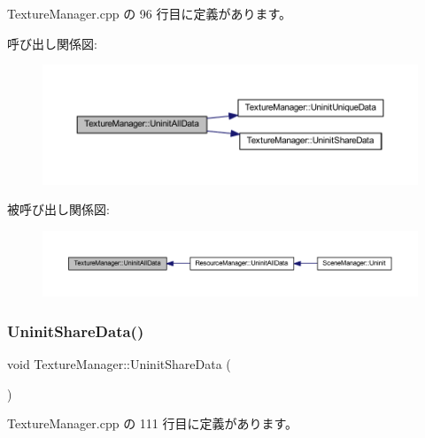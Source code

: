  Texture\+Manager.\+cpp の 96 行目に定義があります。

呼び出し関係図\+:
\nopagebreak
\begin{figure}[H]
\begin{center}
\leavevmode
\includegraphics[width=350pt]{class_texture_manager_a5e81df5cd89e7794fb9230357663a729_cgraph}
\end{center}
\end{figure}
被呼び出し関係図\+:
\nopagebreak
\begin{figure}[H]
\begin{center}
\leavevmode
\includegraphics[width=350pt]{class_texture_manager_a5e81df5cd89e7794fb9230357663a729_icgraph}
\end{center}
\end{figure}
\mbox{\label{class_texture_manager_a770b76a28bac4c20c16960f58a2d3b77}} 
\subsubsection{\texorpdfstring{Uninit\+Share\+Data()}{UninitShareData()}}
{\footnotesize\ttfamily void Texture\+Manager\+::\+Uninit\+Share\+Data (\begin{DoxyParamCaption}{ }\end{DoxyParamCaption})\hspace{0.3cm}{\ttfamily [static]}}



 Texture\+Manager.\+cpp の 111 行目に定義があります。

